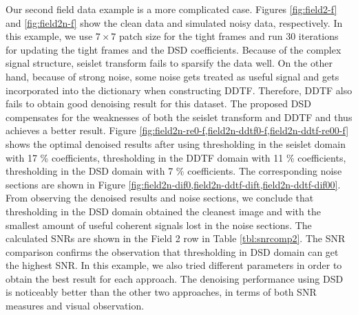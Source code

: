 

Our second field data example is a more complicated case. Figures \ref{fig:field2-f} and \ref{fig:field2n-f} show the clean data and simulated noisy data, respectively. In this example, we use $7\times7$ patch size for the tight frames and run 30 iterations for updating the tight frames and the DSD coefficients. Because of the complex signal structure, seislet transform fails to sparsify the data well. %
On the other hand, because of strong noise, some noise gets treated as useful signal and gets incorporated into the dictionary when constructing DDTF. Therefore, DDTF also fails to obtain good denoising result for this dataset.  The proposed DSD compensates for the weaknesses of both the seislet transform and DDTF and thus achieves a better result. Figure \ref{fig:field2n-re0-f,field2n-ddtf0-f,field2n-ddtf-re00-f} shows the optimal denoised results after using thresholding in the seislet domain with 17 \% coefficients, thresholding in the DDTF domain with 11 \% coefficients, thresholding in the DSD domain with 7 \% coefficients. The corresponding noise sections are shown in Figure \ref{fig:field2n-dif0,field2n-ddtf-dift,field2n-ddtf-dif00}. From observing the denoised results and noise sections, we conclude that thresholding in the DSD domain obtained the cleanest image and with the smallest amount of useful coherent signals lost in the noise sections. The calculated SNRs are shown in the Field 2 row in Table \ref{tbl:snrcomp2}. The SNR comparison confirms the observation that thresholding in DSD domain can get the highest SNR. In this example, we also tried different parameters in order to obtain the best result for each approach. The denoising performance using DSD is noticeably better than the other two approaches, in terms of both SNR measures and visual observation. %

